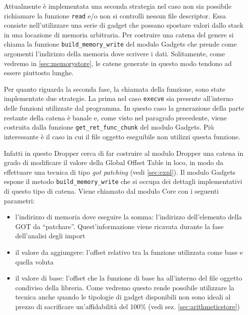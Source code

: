 Attualmente è implementata una seconda strategia nel caso non sia
possibile richiamare la funzione \lstinline{read} e/o non si controlli
nessun file descriptor. Essa consiste nell'utilizzare una serie di
gadget che possano spostare valori dallo stack in una locazione di
memoria arbitraria.  Per costruire una catena del genere si chiama la
funzione \lstinline{build_memory_write} del modulo Gadgets che prende
come argomenti l'indirizzo della memoria dove scrivere i
dati. Solitamente, come vedremo in \ref{sec:memorystore}, le catene
generate in questo modo tendono ad essere piuttosto lunghe.


Per quanto riguarda la seconda fase, la chiamata della funzione, sono
state implementate due strategie. La prima nel caso \lstinline{execve}
sia presente all'interno delle funzioni utilizzate dal programma. In
questo caso la generazione della parte restante della catena è banale
e, come visto nel paragrafo precedente, viene costruita dalla funzione
\lstinline{get_ret_func_chunk} del modulo Gadgets. Più
interessante è il caso in cui il file oggetto eseguibile non utilizzi
questa funzione. 

Infatti in questo Dropper cerca di far costruire al modulo Dropper una
catena in grado di modificare il valore della Global Offset Table in
loco, in modo da effettuare una tecnica di tipo \emph{got patching}
(vedi \ref{sec:expl}). Il modulo Gadgets espone il metodo
\lstinline{build_memory_write} che si occupa dei dettagli
implementativi di questo tipo di catena. Viene chiamato dal modulo
Core con i seguenti parametri:

\begin{itemize}
  \item l'indirizzo di memoria dove eseguire la somma: l'indirizzo
    dell'elemento della GOT da ``patchare''. Quest'informazione viene
    ricavata durante la fase dell'analisi degli import
  \item il valore da aggiungere: l'offset relativo tra la funzione
    utilizzata come base e quella voluta
  \item il valore di base: l'offset che la funzione di base ha
    all'interno del file oggetto condiviso della libreria. Come
    vedremo questo rende possibile utilizzare la tecnica anche quando
    le tipologie di gadget disponibili non sono ideali al prezzo di
    sacrificare un'affidabilità del 100\% (vedi
    sez. \ref{sec:arithmeticstore})

\end{itemize}

